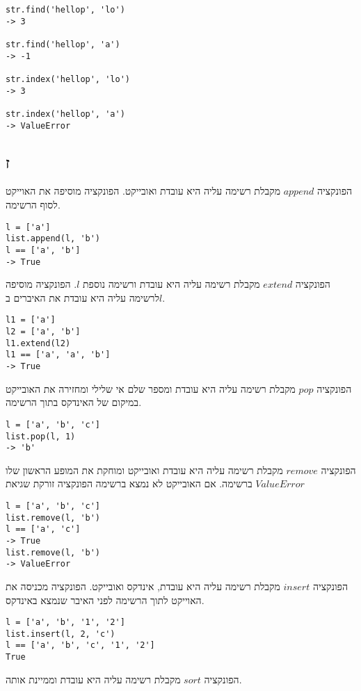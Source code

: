 \documentclass[12pt]{report}
\begin{document}
\begin{lstlisting}
str.find('hellop', 'lo')
-> 3

str.find('hellop', 'a')
-> -1

str.index('hellop', 'lo')
-> 3

str.index('hellop', 'a')
-> ValueError
\end{lstlisting}

\subsection*{ז}
הפונקציה $append$ מקבלת רשימה עליה היא עובדת ואובייקט. הפונקציה מוסיפה את האוייקט לסוף הרשימה.
\begin{lstlisting}
l = ['a']
list.append(l, 'b')
l == ['a', 'b']
-> True
\end{lstlisting}

הפונקציה $extend$ מקבלת רשימה עליה היא עובדת ורשימה נוספת $l$. הפונקציה מוסיפה לרשימה עליה היא עובדת את האיברים ב$l$.
\begin{lstlisting}
l1 = ['a']
l2 = ['a', 'b']
l1.extend(l2)
l1 == ['a', 'a', 'b']
-> True
\end{lstlisting}

הפונקציה $pop$ מקבלת רשימה עליה היא עובדת ומספר שלם אי שלילי ומחזירה את האובייקט במיקום של האינדקס בתוך הרשימה.
\begin{lstlisting}
l = ['a', 'b', 'c']
list.pop(l, 1)
-> 'b'
\end{lstlisting}

הפונקציה $remove$ מקבלת רשימה עליה היא עובדת ואובייקט ומוחקת את המופע הראשון שלו ברשימה. אם האובייקט לא נמצא ברשימה הפונקציה זורקת שגיאת $ValueError$
\begin{lstlisting}
l = ['a', 'b', 'c']
list.remove(l, 'b')
l == ['a', 'c']
-> True
list.remove(l, 'b')
-> ValueError
\end{lstlisting}

הפונקציה $insert$ מקבלת רשימה עליה היא עובדת, אינדקס ואובייקט. הפונקציה מכניסה את האוייקט לתוך הרשימה לפני האיבר שנמצא באינדקס.
\begin{lstlisting}
l = ['a', 'b', '1', '2']
list.insert(l, 2, 'c')
l == ['a', 'b', 'c', '1', '2']
True
\end{lstlisting}

הפונקציה $sort$ מקבלת רשימה עליה היא עובדת וממיינת אותה.
\end{document}
